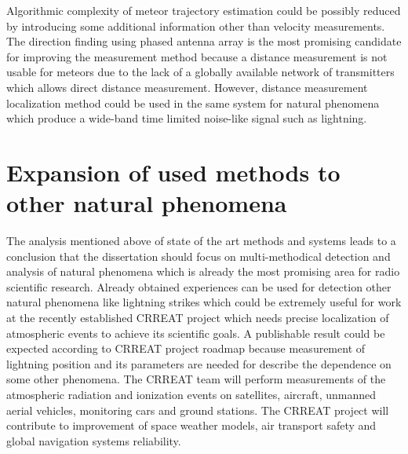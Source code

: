 \documentclass[twoside]{ctuthesis}
\theoremstyle{plain}
\theoremstyle{definition}
\theoremstyle{note}
\begin{document}
Algorithmic complexity of meteor trajectory estimation could be possibly reduced by introducing some additional information other than velocity measurements.  The direction finding using phased antenna array is the most promising candidate for improving the measurement method because a distance measurement is not usable for meteors due to the lack of a globally available network of transmitters which allows direct distance measurement.  However, distance measurement localization method could be used in the same system for natural phenomena which produce a wide-band time limited noise-like signal such as lightning.

\section{Expansion of used methods to other natural phenomena}

The analysis mentioned above of state of the art methods and systems leads to a conclusion that the dissertation should focus on multi-methodical detection and analysis of natural phenomena which is already the most promising area for radio scientific research. 
Already obtained experiences can be used for detection other natural phenomena like lightning strikes which could be extremely useful for work at the recently established CRREAT project which needs precise localization of atmospheric events to achieve its scientific goals. A publishable result could be expected according to CRREAT project roadmap because measurement of lightning position and its parameters are needed for describe the dependence on some other phenomena.  The CRREAT team will perform measurements of the atmospheric radiation and ionization events on satellites, aircraft, unmanned aerial vehicles, monitoring cars and ground stations. The CRREAT project will contribute to improvement of space weather models, air transport safety and global navigation systems reliability.
\end{document}
